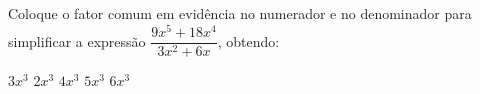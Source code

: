 Coloque o fator comum em evidência no numerador e no denominador para simplificar a expressão $\dfrac{9x^5+18x^4}{3x^2+6x}$, obtendo:

$3x^3$
$2x^3$
$4x^3$
$5x^3$
$6x^3$


